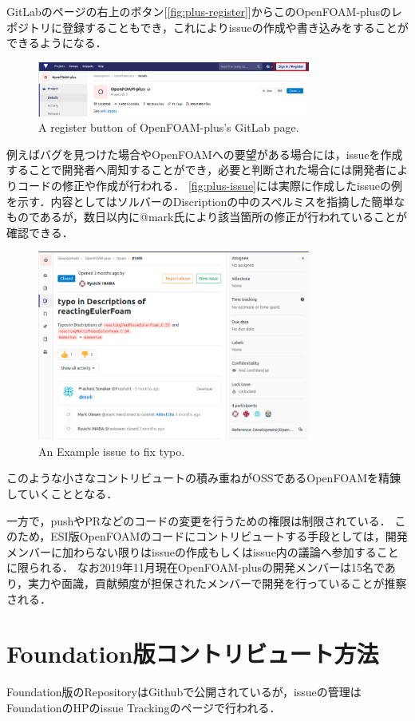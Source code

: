 \documentclass{ltjoc}
\begin{document}
GitLabのページの右上のボタン[\autoref{fig:plus-register}]からこのOpenFOAM-plusのレポジトリに登録することもでき，これによりissueの作成や書き込みをすることができるようになる．
\begin{figure}[htbp]
\centering
\includegraphics[width=0.8\textwidth]{fig/plus_register.png}
\caption{A register button of OpenFOAM-plus's GitLab page.}
\label{fig:plus-register}
\end{figure}
例えばバグを見つけた場合やOpenFOAMへの要望がある場合には，issueを作成することで開発者へ周知することができ，必要と判断された場合には開発者によりコードの修正や作成が行われる．
\autoref{fig:plus-issue}には実際に作成したissueの例を示す．内容としてはソルバーのDiscriptionの中のスペルミスを指摘した簡単なものであるが，数日以内に@mark氏により該当箇所の修正が行われていることが確認できる．
\begin{figure}[htbp]
\centering
\includegraphics[width=0.8\textwidth]{fig/plus_issue.png}
\caption{An Example issue to fix typo.}
\label{fig:plus-issue}
\end{figure}
このような小さなコントリビュートの積み重ねがOSSであるOpenFOAMを精錬していくこととなる．

一方で，pushやPRなどのコードの変更を行うための権限は制限されている．
このため，ESI版OpenFOAMのコードにコントリビュートする手段としては，開発メンバーに加わらない限りはissueの作成もしくはissue内の議論へ参加することに限られる．
なお2019年11月現在OpenFOAM-plusの開発メンバーは15名であり，実力や面識，貢献頻度が担保されたメンバーで開発を行っていることが推察される．\cite{URL:GitLab-plus-members}
%
\section{Foundation版コントリビュート方法}
Foundation版のRepositoryはGithubで公開されているが，issueの管理はFoundationのHPのissue Trackingのページで行われる．
\end{document}
